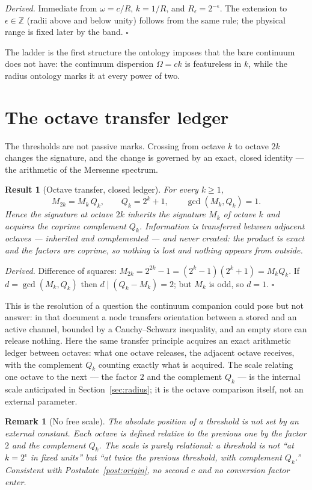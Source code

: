 \documentclass[11pt,a4paper]{article}
\newtheorem{theorem}{Result}
\newtheorem{remark}{Remark}
\begin{document}
\emph{Derived.} Immediate from $\omega=c/R$, $k=1/R$, and $R_\epsilon=2^{-\epsilon}$. The extension to $\epsilon\in\mathbb{Z}$ (radii above and below unity) follows from the same rule; the physical range is fixed later by the band. \hfill$\square$

The ladder is the first structure the ontology imposes that the bare continuum does not have: the continuum dispersion $\Omega=ck$ is featureless in $k$, while the radius ontology marks it at every power of two.

\section{The octave transfer ledger}\label{sec:transfer}

The thresholds are not passive marks. Crossing from octave $k$ to octave $2k$ changes the signature, and the change is governed by an exact, closed identity --- the arithmetic of the Mersenne spectrum.

\begin{theorem}[Octave transfer, closed ledger]\label{res:octave}
For every $k\ge1$,
\[
M_{2k}=M_k\,Q_k,\qquad Q_k=2^{k}+1,\qquad \gcd(M_k,Q_k)=1 .
\]
Hence the signature at octave $2k$ inherits the signature $M_k$ of octave $k$ and acquires the coprime complement $Q_k$. Information is transferred between adjacent octaves --- inherited and complemented --- and never created: the product is exact and the factors are coprime, so nothing is lost and nothing appears from outside.
\end{theorem}

\emph{Derived.} Difference of squares: $M_{2k}=2^{2k}-1=(2^{k}-1)(2^{k}+1)=M_k Q_k$. If $d=\gcd(M_k,Q_k)$ then $d\mid(Q_k-M_k)=2$; but $M_k$ is odd, so $d=1$. \hfill$\square$

This is the resolution of a question the continuum companion could pose but not answer: in that document a node transfers orientation between a stored and an active channel, bounded by a Cauchy--Schwarz inequality, and an empty store can release nothing. Here the same transfer principle acquires an exact arithmetic ledger between octaves: what one octave releases, the adjacent octave receives, with the complement $Q_k$ counting exactly what is acquired. The scale relating one octave to the next --- the factor $2$ and the complement $Q_k$ --- is the internal scale anticipated in Section~\ref{sec:radius}; it is the octave comparison itself, not an external parameter.

\begin{remark}[No free scale]\label{rem:scale}
The absolute position of a threshold is not set by an external constant. Each octave is defined relative to the previous one by the factor $2$ and the complement $Q_k$. The scale is purely relational: a threshold is not ``at $k=2^\epsilon$ in fixed units'' but ``at twice the previous threshold, with complement $Q_k$.'' Consistent with Postulate~\ref{post:origin}, no second $c$ and no conversion factor enter.
\end{remark}
\end{document}
